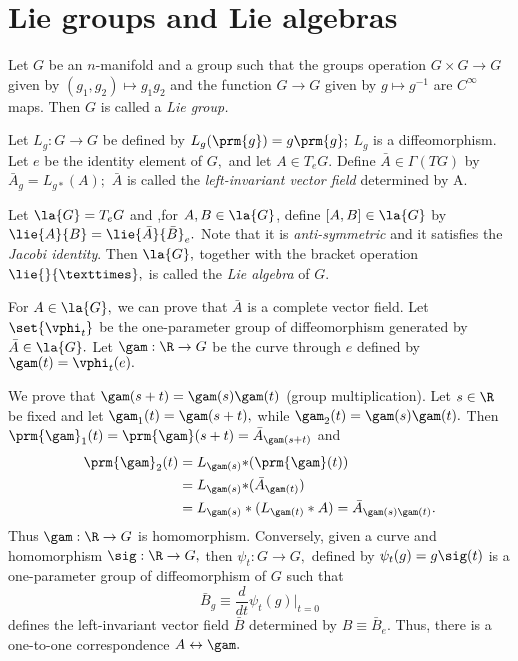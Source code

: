 \section{Lie groups and Lie algebras}

\begin{defn}
 \label{DB:0.3.1}
Let $G$ be an $n$-manifold and a group such that the groups operation  $G \times G \to G$ given by $(g_{1},g_{2})
\mapsto g_{1}g_{2}$ and the function $G \to G$ given by $g \mapsto g^{-1}$ are $C^{\infty}$ maps. Then $G$ is called a
\emph{Lie group.}
\end{defn}

\begin{defn}
 \label{DB:0.3.2}
Let $L_{g}:G \to G$ be defined by $L_{g}(\prm{g})=g\prm{g};$ $L_{g}$ is a diffeomorphism. Let $e$ be the identity
element of $G,$ and let $A \in T_{e}G.$ Define $\bar{A}\in \Gamma(TG)$ by $\bar{A}_{g}=L_{g*}(A);$ $\bar{A}$ is called
the \emph{left-invariant vector field} determined by A.
\end{defn}

\begin{defn}
 \label{DB:0.3.3}
Let $\la{G}=T_{e}G$ and ,for $A,B \in \la{G}$, define $[A,B] \in \la{G}$ by
$\lie{A}{B}=\lie{\bar{A}}{\bar{B}}_{e}.$ Note that it is \emph{anti-symmetric} and it satisfies the \emph{Jacobi
identity}. Then $\la{G},$ together with the bracket operation $\lie{}{×},$ is called the \emph{Lie algebra} of $G.$
\end{defn}


 For $A \in \la{G},$ we can prove that $\bar{A}$ is a complete vector field. Let $\set{\vphi_{t}}$ be the
one-parameter
group of diffeomorphism generated by $\bar{A} \in \la{G}.$ Let $\gam: \R \to G$ be the curve through $e$ defined by
$\gam(t)=\vphi_{t}(e).$

We prove that $\gam(s+t)=\gam(s)\gam(t)$ (group multiplication). Let $s \in \R$ be fixed and let
$\gam_{1}(t)=\gam(s+t),$ while $\gam_{2}(t)=\gam(s)\gam(t).$ Then
$\prm{\gam}_{1}(t)=\prm{\gam}(s+t)=\bar{A}_{\gam(s+t)}$ and
\begin{align*}
 \prm{\gam}_{2}(t)&=L_{\gam(s)}{*}(\prm{\gam}(t)) \\
&= L_{\gam(s)}{*}(\bar{A}_{\gam(t)}) \\
&= L_{\gam(s)}*(L_{\gam(t)}*A)=\bar{A}_{\gam(s)\gam(t)}.
\end{align*}
Thus $\gam:\R \to G$ is homomorphism. Conversely, given a curve and homomorphism $\sig:\R \to G,$ then $\psi_{t}:G \to
G,$ defined by $\psi_{t}(g)=g\sig(t)$ is a one-parameter group of diffeomorphism of $G$ such that
$$
\bar{B}_{g}\equiv \frac{d}{dt}\psi_{t}(g)|_{t=0}
$$
defines the left-invariant vector field $\bar{B}$ determined by $B\equiv \bar{B}_{e}.$ Thus, there is a one-to-one
correspondence $A \leftrightarrow \gam.$

